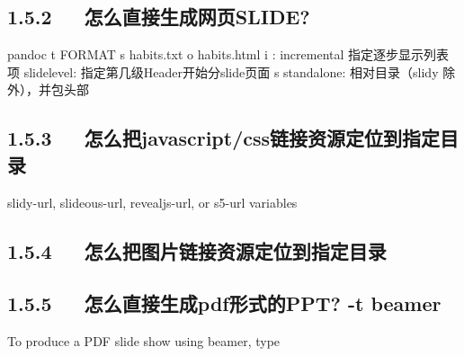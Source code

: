 \documentclass[letterpaper,12pt,english]{sphinxmanual}
\begin{document}
\subsection{1.5.2   怎么直接生成网页SLIDE?}
\label{\detokenize{001software/001install/pandoc:id3}}
\begin{sphinxVerbatim}[commandchars=\\\{\}]
pandoc \PYGZhy{}t FORMAT \PYGZhy{}s habits.txt \PYGZhy{}o habits.html
\PYGZhy{}i : incremental 指定逐步显示列表项
\PYGZhy{}slide\PYGZhy{}\PYGZhy{}level: 指定第几级Header开始分slide页面
\PYGZhy{}s \PYGZhy{}\PYGZhy{}stand\PYGZhy{}alone: 相对目录（slidy 除外），并包头部
\end{sphinxVerbatim}


\subsection{1.5.3   怎么把javascript/css链接资源定位到指定目录}
\label{\detokenize{001software/001install/pandoc:javascript-css}}
slidy-url, slideous-url, revealjs-url, or s5-url variables


\subsection{1.5.4   怎么把图片链接资源定位到指定目录}
\label{\detokenize{001software/001install/pandoc:id4}}
\begin{sphinxVerbatim}[commandchars=\\\{\}]
        \PYGZbs{} \PYGZbs{}
\end{sphinxVerbatim}


\subsection{1.5.5   怎么直接生成pdf形式的PPT? -t beamer}
\label{\detokenize{001software/001install/pandoc:pdfppt-t-beamer}}
To produce a PDF slide show using beamer, type

\begin{sphinxVerbatim}[commandchars=\\\{\}]
     
\end{sphinxVerbatim}
\end{document}
